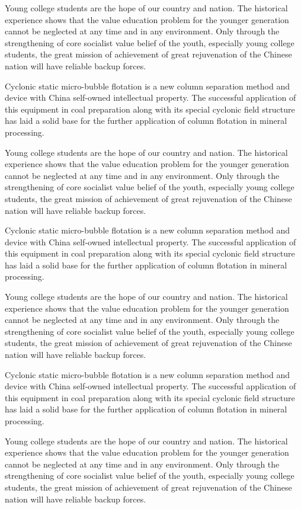 \begin{enabstract}
	Young college students are the hope of our country and nation. The historical experience shows that the value education problem for the younger generation cannot be neglected at any time and in any environment. Only through the strengthening of core socialist value belief of the youth, especially young college students, the great mission of achievement of great rejuvenation of the Chinese nation will have reliable backup forces. \par 
	
	Cyclonic static micro-bubble flotation is a new column separation method and device with China self-owned intellectual property.  The successful application of this equipment in coal preparation along with its special cyclonic field structure has laid a solid base for the further application of column flotation in mineral processing.\par
	
	Young college students are the hope of our country and nation. The historical experience shows that the value education problem for the younger generation cannot be neglected at any time and in any environment. Only through the strengthening of core socialist value belief of the youth, especially young college students, the great mission of achievement of great rejuvenation of the Chinese nation will have reliable backup forces. \par 
	
	Cyclonic static micro-bubble flotation is a new column separation method and device with China self-owned intellectual property.  The successful application of this equipment in coal preparation along with its special cyclonic field structure has laid a solid base for the further application of column flotation in mineral processing.\par
	Young college students are the hope of our country and nation. The historical experience shows that the value education problem for the younger generation cannot be neglected at any time and in any environment. Only through the strengthening of core socialist value belief of the youth, especially young college students, the great mission of achievement of great rejuvenation of the Chinese nation will have reliable backup forces. \par 
	
	Cyclonic static micro-bubble flotation is a new column separation method and device with China self-owned intellectual property.  The successful application of this equipment in coal preparation along with its special cyclonic field structure has laid a solid base for the further application of column flotation in mineral processing.\par
	Young college students are the hope of our country and nation. The historical experience shows that the value education problem for the younger generation cannot be neglected at any time and in any environment. Only through the strengthening of core socialist value belief of the youth, especially young college students, the great mission of achievement of great rejuvenation of the Chinese nation will have reliable backup forces. \par 
	

\end{enabstract}

